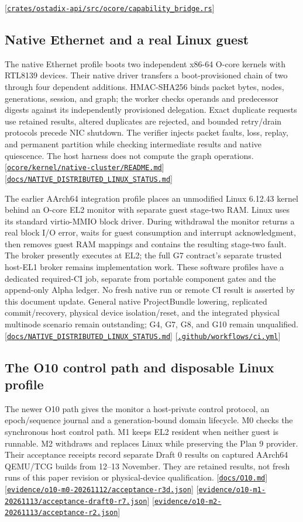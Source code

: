 \documentclass[11pt,oneside]{article}
\newcommand{\src}[1]{\textcolor{OSlate}{\scriptsize[\href{https://github.com/lostadi/OSTADIX/blob/c0b02c326b2329a95ba52447c7180bc93957cd57/#1}{\nolinkurl{#1}}]}\allowbreak}
\begin{document}
\par\src{crates/ostadix-api/src/ocore/capability_bridge.rs}

\clearpage
\subsection{Native Ethernet and a real Linux guest}

The native Ethernet profile boots two independent x86-64 O-core kernels with
RTL8139 devices. Their native driver transfers a boot-provisioned chain of
two through four dependent additions. HMAC-SHA256 binds packet bytes, nodes,
generations, session, and graph; the worker checks operands and predecessor
digests against its independently provisioned delegation. Exact duplicate
requests use retained results, altered duplicates are rejected, and bounded
retry/drain protocols precede NIC shutdown. The verifier injects packet faults,
loss, replay, and permanent partition while checking intermediate results and
native quiescence. The host harness does not compute the graph operations.
\src{ocore/kernel/native-cluster/README.md}
\src{docs/NATIVE_DISTRIBUTED_LINUX_STATUS.md}

The earlier AArch64 integration profile places an unmodified Linux 6.12.43 kernel behind an O-core
EL2 monitor with separate guest stage-two RAM. Linux uses its standard
virtio-MMIO block driver. During withdrawal the monitor returns a real block
I/O error, waits for guest consumption and interrupt acknowledgment, then
removes guest RAM mappings and contains the resulting stage-two fault.
The broker presently executes at EL2; the full G7 contract's separate trusted
host-EL1 broker remains implementation work. These software profiles have a
dedicated required-CI job, separate from portable component gates and the
append-only Alpha ledger. No fresh native run or remote CI result is asserted
by this document update. General native ProjectBundle lowering, replicated
commit/recovery, physical device isolation/reset, and the integrated physical
multinode scenario remain outstanding; G4, G7, G8, and G10 remain unqualified.
\src{docs/NATIVE_DISTRIBUTED_LINUX_STATUS.md}
\src{.github/workflows/ci.yml}

\subsection{The O10 control path and disposable Linux profile}

The newer O10 path gives the monitor a host-private control protocol,
an epoch/sequence journal and a generation-bound domain lifecycle. M0 checks
the synchronous host control path. M1 keeps EL2 resident when neither guest
is runnable. M2 withdraws and replaces Linux while preserving the Plan 9
provider. Their acceptance receipts record separate Draft 0 results on
captured AArch64 QEMU/TCG builds from 12--13 November. They are retained
results, not fresh runs of this paper revision or physical-device
qualification.
\src{docs/O10.md}
\src{evidence/o10-m0-20261112/acceptance-r3d.json}
\src{evidence/o10-m1-20261113/acceptance-draft0-r7.json}
\src{evidence/o10-m2-20261113/acceptance-r2.json}
\end{document}
